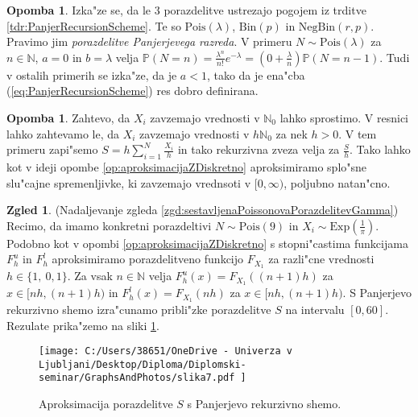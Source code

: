 \documentclass[12pt, a4paper, reqno]{amsart}
\theoremstyle{definition}
\newtheorem{zgled}[definicija]{Zgled}
\newtheorem{opomba}[definicija]{Opomba}
\theoremstyle{plain}
\newcommand{\N}{\mathbb{N}}
\newcommand{\Prob}{\mathbb{P}}
\newcommand{\1}{\mathds{1}}
\newcommand{\Pois}[1]{\text{Pois}(#1)}
\begin{document}
    \begin{opomba}
        Izka"ze se, da le $3$ porazdelitve 
        ustrezajo pogojem iz trditve \ref{tdr:PanjerRecursionScheme}. Te so $\Pois{\lambda}$, $\text{Bin}(p)$ in
        $\text{NegBin}(r, p)$. Pravimo jim \textit{porazdelitve Panjerjevega razreda}. V primeru $N\sim\Pois{\lambda}$ za $n\in\N$, $a = 0$ in $b = \lambda$ velja $\Prob\left(N = n\right) = \frac{\lambda^n}{n!}e^{-\lambda} = 
        \left(0 + \frac{\lambda}{n}\right)\Prob\left(N = n - 1\right)$. Tudi v ostalih primerih se izka"ze, da je $a < 1$, tako da je 
        ena"cba (\ref{eq:PanjerRecursionScheme}) res dobro definirana.
    \end{opomba}

    \begin{opomba}
        Zahtevo, da $X_i$ zavzemajo vrednosti v $\N_0$ lahko sprostimo. V resnici 
        lahko zahtevamo le, da $X_i$ zavzemajo vrednosti v $h\N_0$ za nek $h>0$. V tem primeru 
        zapi"semo $S = h\sum_{i=1}^N\frac{X_i}{h}$ in tako rekurzivna zveza velja za $\frac{S}{h}$. 
        Tako lahko kot v ideji opombe \ref{op:aproksimacijaZDiskretno} aproksimiramo splo"sne slu"cajne 
        spremenljivke, ki zavzemajo vrednsoti v $[0, \infty)$, poljubno natan"cno.
    \end{opomba}  

    \begin{zgled}(Nadaljevanje zgleda \ref{zgd:sestavljenaPoissonovaPorazdelitevGamma}) Recimo, da imamo
        konkretni porazdeltivi $N\sim\Pois{9}$ in $X_i\sim\text{Exp}(\frac{1}{\pi})$. Podobno kot v opombi
        \ref{op:aproksimacijaZDiskretno} s stopni"castima funkcijama
        $F^u_h$ in $F_h^l$ aproksimiramo porazdelitveno funkcijo $F_{X_1}$ za razli"cne vrednosti $h \in \{1, \ 0,1\}$.
        Za vsak $n\in\N$ velja $F^u_h(x) = F_{X_1}((n+1)h)$ za $x\in\bigl[nh, (n+1)h\bigr)$ in 
        $F^l_h(x) = F_{X_1}(nh)$ za $x\in\bigl[nh, (n+1)h\bigr)$.
        S Panjerjevo rekurzivno shemo izra"cunamo pribli"zke porazdelitve $S$ na intervalu $[0, 60]$.
        Rezulate prika"zemo na sliki \ref{fig:slika7}. 
 
        \begin{figure}[h!]
            \begin{center}
                \texttt{[image: 
                    C:/Users/38651/OneDrive - Univerza v Ljubljani/Desktop/Diploma/Diplomski-seminar/GraphsAndPhotos/slika7.pdf
                ]}
                \caption{Aproksimacija porazdelitve $S$ s Panjerjevo rekurzivno shemo.}
                \label{fig:slika7}
            \end{center}
        \end{figure}
        
        \label{zgd:PanjerExp}  
    \end{zgled}
 
\end{document}
